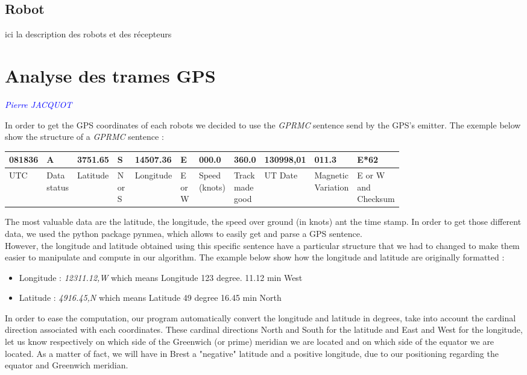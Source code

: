 \documentclass[10pt,a4paper]{report}
\begin{document}
\subsection{Robot}
ici la description des robots et des récepteurs
\section{Analyse des trames GPS}
\textcolor{blue}{\textit{Pierre JACQUOT}}

In order to get the GPS coordinates of each robots we decided to use the \textit{GPRMC} sentence send by the GPS's emitter. The exemple below show the structure of a \textit{GPRMC} sentence : \
\begin{center}
\begin{tabular}{|m{0.05\linewidth}|m{0.06\linewidth}|m{0.07\linewidth}|m{0.07\linewidth}|m{0.08\linewidth}|m{0.07\linewidth}|m{0.07\linewidth}|m{0.04\linewidth}|m{0.08\linewidth}|m{0.1\linewidth}|m{0.07\linewidth}|}
\hline
    081836 & A & 3751.65 & S & 14507.36 & E & 000.0 & 360.0 & 130998,01 & 011.3 & E*62  \\ \hline
     UTC & Data status & Latitude & N or S & Longitude & E or W & Speed (knots) & Track made good &  UT Date & Magnetic Variation & E or W and Checksum \\ \hline

\end{tabular}
\end{center}
The most valuable data are the latitude, the longitude, the speed over ground (in knots) ant the time stamp. In order to get those different data, we used the python package pynmea, which allows to easily get and parse a GPS sentence. \\
However, the longitude and latitude obtained using this specific sentence have a particular structure that we had to changed to make them easier to manipulate and compute in our algorithm. The example below show how the longitude and latitude are originally formatted :
\
\begin{itemize}
  \item Longitude  : \textit{12311.12,W} which means Longitude 123 degree. 11.12 min West
  \item Latitude : \textit{4916.45,N} which means Latitude 49 degree 16.45 min North
\end{itemize}

In order to ease the computation, our program automatically convert the longitude and latitude in degrees, take into account the cardinal direction associated with each coordinates.
These cardinal directions North and South for the latitude and East and West for the longitude, let us know respectively on which side of the Greenwich (or prime) meridian we are located and on which side of the equator we are located. As a matter of fact, we will have in Brest a "negative" latitude and a positive longitude, due to our positioning regarding the equator and Greenwich meridian.\\
\end{document}
